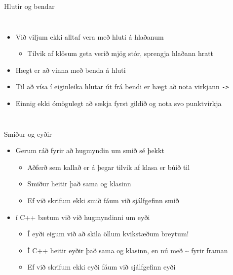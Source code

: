 \documentclass{beamer}
\begin{document}
\begin{frame}{Hlutir og bendar}
    \begin{columns}
        \begin{itemize}
            \item Við viljum ekki alltaf vera með hluti á hlaðanum
            \begin{itemize}
                \item Tilvik af klösum geta verið mjög stór, sprengja hlaðann hratt
            \end{itemize} 
            \item Hægt er að vinna með benda á hluti
            \item Til að vísa í eiginleika hlutar út frá bendi er hægt að nota virkjann \texttt{->}
            \item Einnig ekki ómögulegt að sækja fyrst gildið og nota svo punktvirkja
        \end{itemize}
    \end{columns}
\end{frame}

\begin{frame}{Smiður og eyðir}
    \begin{itemize}
        \item Gerum ráð fyrir að hugmyndin um smið  sé þekkt
        \begin{itemize}
            \item Aðferð sem kallað er á þegar tilvik af klasa er búið til
            \item Smiður heitir það sama og klasinn
            \item Ef við skrifum ekki smið fáum við sjálfgefinn smið
        \end{itemize}
        \item í C++ bætum við við hugmyndinni um eyði  
        \begin{itemize}
            \item Í eyði eigum við að skila öllum kvikstæðum breytum!
            \item Í C++ heitir eyðir það sama og klasinn, en nú með \textasciitilde{} fyrir framan
            \item Ef við skrifum ekki eyði fáum við sjálfgefinn eyði
        \end{itemize}
    \end{itemize}
\end{frame}
\end{document}
